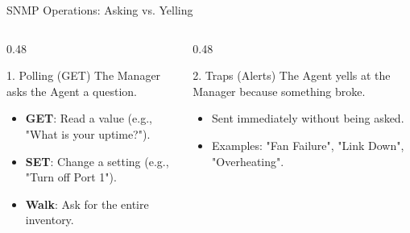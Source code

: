 \documentclass[aspectratio=169]{beamer}  %
\begin{document}
\begin{frame}{SNMP Operations: Asking vs. Yelling}
    \begin{columns}[T]
        \begin{column}{0.48\textwidth}
            \begin{block}{1. Polling (GET)}
                \footnotesize
                The Manager asks the Agent a question.
                \begin{itemize}
                    \item \textbf{GET}: Read a value (e.g., "What is your uptime?").
                    \item \textbf{SET}: Change a setting (e.g., "Turn off Port 1").
                    \item \textbf{Walk}: Ask for the entire inventory.
                \end{itemize}
            \end{block}
        \end{column}
        \begin{column}{0.48\textwidth}
            \begin{block}{2. Traps (Alerts)}
                \footnotesize
                The Agent yells at the Manager because something broke.
                \begin{itemize}
                    \item Sent immediately without being asked.
                    \item Examples: "Fan Failure", "Link Down", "Overheating".
                \end{itemize}
            \end{block}
        \end{column}
    \end{columns}
    \vspace{0.5cm}
    \begin{center}
    \end{center}
\end{frame}
\end{document}
